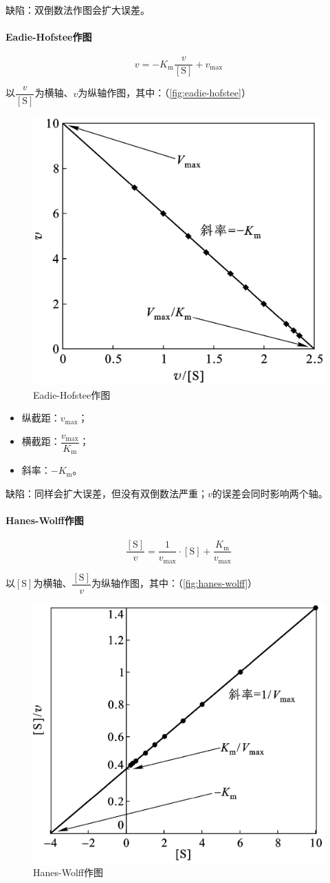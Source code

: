 缺陷：双倒数法作图会扩大误差。

\paragraph{Eadie-Hofstee作图}

\[v = -K_{\text{m}} \frac{v}{[\text{S}]} + v_{\text{max}}\]

以$\dfrac{v}{[\text{S}]}$为横轴、$v$为纵轴作图，其中：（\autoref{fig:eadie-hofstee}）

\begin{figure}[htbp]
	\centering
	\includegraphics[width=0.5\linewidth]{Pics/Eadie-Hofstee作图}
	\caption{Eadie-Hofstee作图}
	\label{fig:eadie-hofstee}
\end{figure}

\begin{itemize}
	\item 纵截距：$v_{\text{max}}$；
	\item 横截距：$\dfrac{v_{\text{max}}}{K_{\text{m}}}$；
	\item 斜率：$-K_{\text{m}}$。
\end{itemize}

缺陷：同样会扩大误差，但没有双倒数法严重；$v$的误差会同时影响两个轴。

\paragraph{Hanes-Wolff作图}

\[\frac{[\text{S}]}{v} = \frac{1}{v_{\text{max}}} \cdot [\text{S}] + \frac{K_{\text{m}}}{v_{\text{max}}}\]

以$[\text{S}]$为横轴、$\dfrac{[\text{S}]}{v}$为纵轴作图，其中：（\autoref{fig:hanes-wolff}）

\begin{figure}[htbp]
	\centering
	\includegraphics[width=0.5\linewidth]{"Pics/Hanes-Wolff 作图"}
	\caption{Hanes-Wolff作图}
	\label{fig:hanes-wolff}
\end{figure}

